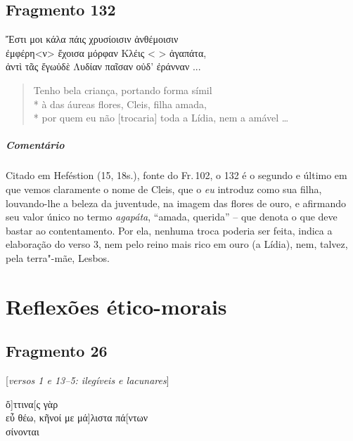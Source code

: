 {\pagebreak
\section{Fragmento 132}

\begin{gkverse}
Ἔστι μοι κάλα πάις χρυσίοισιν ἀνθέμοισιν\\
ἐμφέρη<ν> ἔχοισα μόρφαν Κλέις <  > ἀγαπάτα,\\
ἀντὶ τᾶς ἔγωὐδὲ Λυδίαν παῖσαν οὐδ’ ἐράνναν ...
\end{gkverse}

\begin{verse}
Tenho bela criança, portando forma símil\\*
à das áureas flores, Cleis, filha amada,\\*
por quem eu não [trocaria] toda a Lídia, nem a amável \ldots{}
\end{verse}

\medskip

{\paragraph{Comentário} Citado em Heféstion (15, 18s.), fonte do Fr.\,102, o 132 é o segundo e último em que vemos claramente o nome de Cleis, que o \textit{eu} introduz como sua filha, louvando-lhe a
beleza da juventude, na imagem das flores de ouro, e afirmando seu valor único no termo \textit{agapáta}, ``amada, querida'' -- que denota o que deve bastar ao contentamento. Por ela, nenhuma troca poderia ser feita, indica a elaboração do verso 3, nem pelo reino mais rico em ouro (a Lídia), nem, talvez, pela terra"-mãe, Lesbos.}



\chapter{Reflexões ético-morais}

\section{Fragmento 26} 

\begin{gkverse}
\textnormal{[\textit{versos 1 e 13--5: ilegíveis e lacunares}]}

ὄ]ττινα[ς γὰρ\\
εὖ θέω, κῆνοί με μά]λιστα πά[ντων\\
σίνονται


\end{gkverse}}
